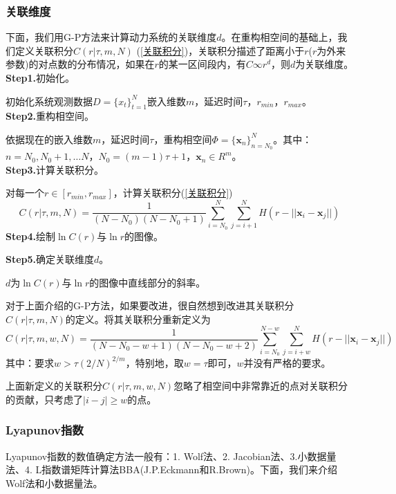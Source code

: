         \subsubsection{关联维度}
            \par
            下面，我们用G-P方法来计算动力系统的关联维度$d$。在重构相空间的基础上，我们定义关联积分$C(r|\tau, m, N)$ (\ref{关联积分})，关联积分描述了距离小于$r$($r$为外来参数)的对点数的分布情况，如果在$r$的某一区间段内，有$C \infty r^d$，则$d$为关联维度。\\
            \textbf{Step1.}初始化。\par
            初始化系统观测数据$D=\{x_t\}_{t=1}^N$嵌入维数$m$，延迟时间$\tau$，$r_{min}$，$r_{max}$。\\
            \textbf{Step2.}重构相空间。\par
            依据现在的嵌入维数$m$，延迟时间$\tau$，重构相空间$\Phi = \{\mathbf{x}_n\}_{n=N_0}^N$。其中：$n = N_0,N_0+1,\dots N$，$N_0 = (m-1) \tau + 1$，$\mathbf{x}_n \in R^m$。\\
            \textbf{Step3.}计算关联积分。\par
            对每一个$r \in [r_{min}, r_{max}]$，计算关联积分(\ref{关联积分})
            \[
                C(r|\tau, m, N) = \frac{1}{(N-N_0) (N - N_0 + 1)} \sum_{i=N_0}^N \sum_{j = i + 1} ^N H(r - ||\mathbf{x}_i - \mathbf{x}_j||)
            \]
            \textbf{Step4.}绘制$\ln C(r)$与$\ln r$的图像。\par
            \textbf{Step5.}确定关联维度$d$。\par
            $d$为$\ln C(r)$与$\ln r$的图像中直线部分的斜率。
            \par
            对于上面介绍的G-P方法，如果要改进，很自然想到改进其关联积分$C(r|\tau, m, N)$的定义。将其关联积分重新定义为
            \[
                C(r|\tau, m,w, N) = \frac{1}{(N-N_0-w + 1) (N - N_0 -w + 2)} \sum_{i=N_0}^{N-w} \sum_{j = i + w} ^N H(r - ||\mathbf{x}_i - \mathbf{x}_j||)
            \]
            \noindent 其中：要求$w > \tau (2/N)^{2/m}$，特别地，取$w = \tau$即可，$w$并没有严格的要求。
            \par
            上面新定义的关联积分$C(r|\tau, m,w, N)$忽略了相空间中非常靠近的点对关联积分的贡献，只考虑了$|i-j| \geq w$的点。

        \subsubsection{Lyapunov指数}
            \par
            Lyapunov指数的数值确定方法一般有：1. Wolf法、2. Jacobian法、3.小数据量法、4. L指数谱矩阵计算法BBA(J.P.Eckmann和R.Brown)。下面，我们来介绍Wolf法和小数据量法。
